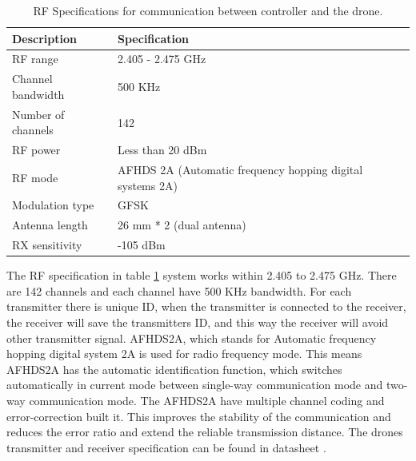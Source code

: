 \begin{table}[H] 
\caption{RF Specifications for communication between controller and the drone.} \label{tab:RFSpec}
\centering
\begin{tabular}{|l|m{9cm}|}
\hline
\textbf{Description}  & \textbf{Specification}                                    \\ \hline
RF range              & 2.405 - 2.475 GHz                                         \\ \hline
Channel bandwidth     & 500 KHz                                                   \\ \hline
Number of channels    & 142                                                       \\ \hline
RF power              & Less than 20 dBm                                          \\ \hline
RF mode               & AFHDS 2A (Automatic frequency hopping digital systems 2A) \\ \hline
Modulation type       & GFSK                                                      \\ \hline
Antenna length        & 26 mm * 2 (dual antenna)                                  \\ \hline
RX sensitivity        & -105 dBm                                                  \\ \hline
\end{tabular}
\end{table}

The RF specification in table \ref{tab:RFSpec} system works within 2.405 to 2.475 GHz. There are 142 channels and each channel have 500 KHz bandwidth. For each transmitter there is unique ID, when the transmitter is connected to the receiver, the receiver will save the transmitters ID, and this way the receiver will avoid other transmitter signal.
AFHDS2A, which stands for Automatic frequency hopping digital system 2A is used for radio frequency mode. This means AFHDS2A has the automatic identification function, which switches automatically in current mode between single-way communication mode and two-way communication mode. The AFHDS2A have multiple channel coding and error-correction built it. This improves the stability of the communication and reduces the error ratio and extend the reliable transmission distance. The drones transmitter and receiver specification can be found in datasheet \cite{ControllerUnit}.


